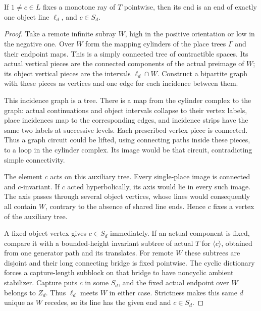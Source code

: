 \begin{lemma}\label{transfer:ray-capture}
If \(1\ne c\in L\) fixes a monotone ray of \(\widehat T\) pointwise, then its end is an end of exactly one object line \(\ell_d\), and \(c\in S_d\).
\end{lemma}
\begin{proof}
Take a remote infinite subray $W$, high in the positive orientation
or low in the negative one. Over $W$ form the mapping cylinders of
the place trees $\Gamma$ and their endpoint maps. This is a simply
connected tree of contractible spaces. Its actual vertical pieces
are the connected components of the actual preimage of $W$; its
object vertical pieces are the intervals $\ell_d\cap W$. Construct
a bipartite graph with these pieces as vertices and one edge for
each incidence between them.

This incidence graph is a tree. There is a map from the cylinder
complex to the graph: actual continuations and object intervals
collapse to their vertex labels, place incidences map to the
corresponding edges, and incidence strips have the same two labels
at successive levels. Each prescribed vertex piece is connected.
Thus a graph circuit could be lifted, using connecting paths inside
these pieces, to a loop in the cylinder complex. Its image would be
that circuit, contradicting simple connectivity.

The element $c$ acts on this auxiliary tree. Every single-place
image is connected and $c$-invariant. If $c$ acted hyperbolically,
its axis would lie in every such image. The axis passes through
several object vertices, whose lines would consequently all contain
$W$, contrary to the absence of shared line ends. Hence $c$ fixes
a vertex of the auxiliary tree.

A fixed object vertex gives $c\in S_d$ immediately. If an actual
component is fixed, compare it with a bounded-height invariant
subtree of actual $T$ for $\langle c\rangle$, obtained from one
generator path and its translates. For remote $W$ these subtrees
are disjoint and their long connecting bridge is fixed pointwise.
The cyclic dictionary forces a capture-length subblock on that
bridge to have noncyclic ambient stabilizer. Capture puts $c$ in
some $S_d$, and the fixed actual endpoint over $W$ belongs to $Z_d$.
Thus $\ell_d$ meets $W$ in either case. Strictness makes this same
$d$ unique as $W$ recedes, so its line has the given end and
$c\in S_d$.
\end{proof}

